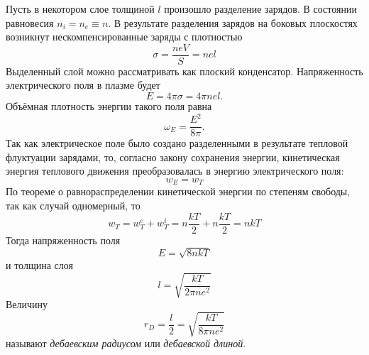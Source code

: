\documentclass[12pt,a4paper]{article}
\begin{document}
    Пусть в некотором слое толщиной $l$ произошло разделение зарядов. В состоянии равновесия $n_i = n_e \equiv n$. В результате разделения зарядов на боковых плоскостях возникнут нескомпенсированные заряды с плотностью
    $$\sigma = \frac{neV}{S} = nel$$
    Выделенный слой можно рассматривать как плоский конденсатор. Напряженность электрического поля в плазме будет
    $$E = 4\pi \sigma = 4\pi n el.$$
    Объёмная плотность энергии такого поля равна
    $$\omega_E = \frac{E^2}{8\pi}.$$
    Так как электрическое поле было создано разделенными в результате тепловой флуктуации зарядами, то, согласно закону сохранения энергии, кинетическая энергия теплового движения преобразовалась в энергию электрического поля:
    $$w_E = w_T$$
    По теореме о равнораспределении кинетической энергии по степеням свободы, так как случай одномерный, то
    $$
    w_T = w_{T}^e + w_{T}^i = n \frac{kT}{2} + n\frac{kT}{2} = nkT
    $$
    Тогда напряженность поля
    $$
    E = \sqrt{8nkT}
    $$
    и толщина слоя
    $$
    l = \sqrt{\frac{kT}{2\pi n e^2}}
    $$
    Величину 
    \begin{equation}
    r_D = \frac{l}{2} = \sqrt{\frac{kT}{8\pi n e^2}}
    \end{equation}
    называют \textit{дебаевским радиусом} или \textit{дебаевской длиной}. 
    
\end{document}
